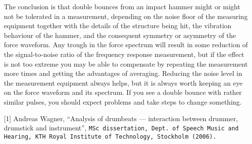 

  The conclusion is that double bounces from an impact hammer might or might 
  not be tolerated in a measurement, depending on the noise floor of the 
  measuring equipment together with the details of the structure being hit, the 
  vibration behaviour of the hammer, and the consequent symmetry or asymmetry 
  of the force waveform. Any trough in the force spectrum will result in some 
  reduction of the signal-to-noise ratio of the frequency response measurement, 
  but if the effect is not too extreme you may be able to compensate by 
  repeating the measurement more times and getting the advantages of averaging. 
  Reducing the noise level in the measurement equipment always helps, but it is 
  always worth keeping an eye on the force waveform and its spectrum. If you 
  see a double bounce with rather similar pulses, you should expect problems 
  and take steps to change something. 

  \sectionreferences{}[1] Andreas Wagner, “Analysis of drumbeats — interaction 
  between drummer, drumstick and instrument”, \tt{}MSc dissertation\rm{}, Dept. 
  of Speech Music and Hearing, KTH Royal Institute of Technology, Stockholm 
  (2006). 